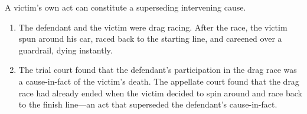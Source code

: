 A victim's own act can constitute a superseding intervening cause.

\begin{enumerate}
    \item The defendant and the victim were drag racing. After the race, the 
    victim spun around his car, raced back to the starting line, and careened 
    over a guardrail, dying instantly.
    \item The trial court found that the defendant's participation in the drag 
    race was a cause-in-fact of the victim's death. The appellate court found 
    that the drag race had already ended when the victim decided to spin 
    around and race back to the finish line---an act that superseded the 
    defendant's cause-in-fact.
\end{enumerate}
